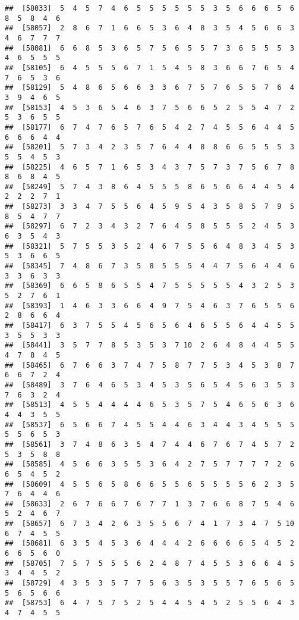 \documentclass[
]{book}
\begin{document}
\begin{verbatim}
##  [58033]  5  4  5  7  4  6  5  5  5  5  5  5  3  5  6  6  6  5  6  8  5  8  4  6
##  [58057]  2  8  6  7  1  6  6  5  3  6  4  8  3  5  4  5  6  6  3  4  6  7  7  7
##  [58081]  6  6  8  5  3  6  5  7  5  6  5  5  7  3  6  5  5  5  3  4  6  5  5  5
##  [58105]  6  4  5  5  5  6  7  1  5  4  5  8  3  6  6  7  6  5  4  7  6  5  3  6
##  [58129]  5  4  8  6  5  6  6  3  3  6  7  5  7  6  5  5  7  6  4  3  9  4  6  5
##  [58153]  4  5  3  6  5  4  6  3  7  5  6  6  5  2  5  5  4  7  2  5  3  6  5  5
##  [58177]  6  7  4  7  6  5  7  6  5  4  2  7  4  5  5  6  4  4  5  6  6  6  4  4
##  [58201]  5  7  3  4  2  3  5  7  6  4  4  8  8  6  6  5  5  5  3  5  5  4  5  3
##  [58225]  4  6  5  7  1  6  5  3  4  3  7  5  7  3  7  5  6  7  8  8  6  8  4  5
##  [58249]  5  7  4  3  8  6  4  5  5  5  8  6  5  6  6  4  4  5  4  2  2  2  7  1
##  [58273]  3  3  4  7  5  5  6  4  5  9  5  4  3  5  8  5  7  9  5  8  5  4  7  7
##  [58297]  6  7  2  3  4  3  2  7  6  4  5  8  5  5  5  2  4  5  3  6  3  5  4  3
##  [58321]  5  7  5  5  3  5  2  4  6  7  5  5  6  4  8  3  4  5  3  5  3  6  6  5
##  [58345]  7  4  8  6  7  3  5  8  5  5  5  4  4  7  5  6  4  4  6  3  3  6  3  3
##  [58369]  6  6  5  8  6  5  5  4  7  5  5  5  5  5  4  3  2  5  3  5  2  7  6  1
##  [58393]  1  4  6  3  3  6  6  4  9  7  5  4  6  3  7  6  5  5  6  2  8  6  6  4
##  [58417]  6  3  7  5  5  4  5  6  5  6  4  6  5  5  6  4  4  5  5  3  5  5  3  3
##  [58441]  3  5  7  7  8  5  3  5  3  7 10  2  6  4  8  4  4  5  5  4  7  8  4  5
##  [58465]  6  7  6  6  3  7  4  7  5  8  7  7  5  3  4  5  3  8  7  6  6  7  2  4
##  [58489]  3  7  6  4  6  5  3  4  5  3  5  6  5  4  5  6  3  5  3  7  6  3  2  4
##  [58513]  4  5  5  4  4  4  4  6  5  3  5  7  5  4  6  5  6  3  6  4  4  3  5  5
##  [58537]  6  5  6  6  7  4  5  5  4  4  6  3  4  4  3  4  5  5  5  5  5  6  5  3
##  [58561]  3  7  4  8  6  3  5  4  7  4  4  6  7  6  7  4  5  7  2  5  3  5  8  8
##  [58585]  4  5  6  6  3  5  5  3  6  4  2  7  5  7  7  7  7  2  6  6  5  4  5  2
##  [58609]  4  5  5  6  5  8  6  6  5  5  6  5  5  5  5  6  2  3  5  7  6  4  4  6
##  [58633]  2  6  7  6  6  7  6  7  7  1  3  7  6  6  8  7  5  4  6  5  2  4  6  7
##  [58657]  6  7  3  4  2  6  3  5  5  6  7  4  1  7  3  4  7  5 10  6  7  4  5  5
##  [58681]  6  3  5  4  5  3  6  4  4  4  2  6  6  6  6  5  4  5  2  6  6  5  6  0
##  [58705]  7  5  7  5  5  5  6  2  4  8  7  4  5  5  3  6  6  4  5  3  4  4  5  2
##  [58729]  4  3  5  3  5  7  7  5  6  3  5  3  5  5  7  6  5  6  5  5  6  5  6  6
##  [58753]  6  4  7  5  7  5  2  5  4  4  5  4  5  2  5  5  6  4  3  4  7  4  5  5

\end{verbatim}
\end{document}
